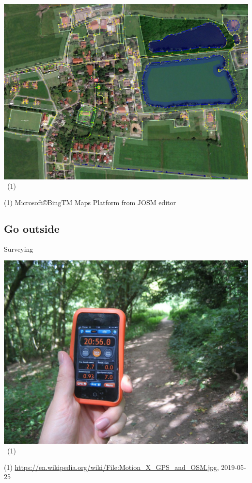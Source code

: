 \documentclass{beamer}
\begin{document}
	\begin{frame}
		\begin{center}
			\includegraphics[width=0.8\linewidth,height=0.8\textheight,keepaspectratio]{images/trace_imagery.png}~\tiny{(1)}
		\end{center}
		{\tiny (1) Microsoft\copyright BingTM Maps Platform from JOSM editor}
	\end{frame}
	
	\subsection{Go outside}
	
	\begin{frame}{Surveying}
		\begin{center}
			\includegraphics[width=0.7\linewidth,height=0.7\textheight,keepaspectratio]{images/surveying}~\tiny{(1)}
		\end{center}
		{\tiny (1) \url{https://en.wikipedia.org/wiki/File:Motion\_X\_GPS\_and\_OSM.jpg}, 2019-05-25}
	\end{frame}
\end{document}
